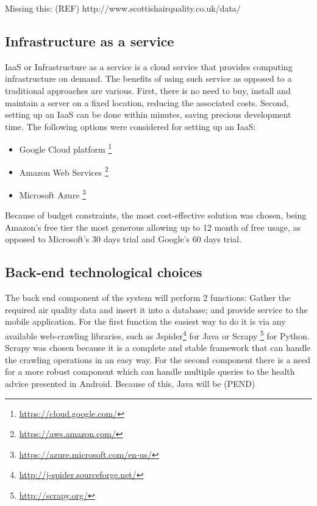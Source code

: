 Missing this: (REF)
http://www.scottishairquality.co.uk/data/

\subsection{Infrastructure as a service}
IaaS or Infrastructure as a service is a cloud service that provides computing infrastructure on demand. The benefits of using such service as opposed to a traditional approaches are various. First, there is no need to buy, install and maintain a server on a fixed location, reducing the associated costs. Second, setting up an IaaS can be done within minutes, saving precious development time. The following options were considered for setting up an IaaS: 

\begin{itemize}
	\item Google Cloud platform \footnote{\url{https://cloud.google.com/}}
    \item Amazon Web Services \footnote{\url{https://aws.amazon.com/}}
    \item Microsoft Azure \footnote{\url{https://azure.microsoft.com/en-us/}}
\end{itemize}

Because of budget constraints, the most cost-effective solution was chosen, being Amazon's free tier the most generous allowing up to 12 month of free usage, as opposed to Microsoft's 30 days trial and Google's 60 days trial.

\subsection{Back-end technological choices}
The back end component of the system will perform 2 functions: Gather the required air quality data and insert it into a database; and provide service to the mobile application. For the  first function the easiest way to do it is via any available web-crawling libraries, such as Jspider\footnote{\url{http://j-spider.sourceforge.net/}} for Java or Scrapy \footnote{\url{http://scrapy.org/}} for Python. Scrapy was chosen because it is a complete and stable framework that can handle the crawling operations in an easy way. 
For the second component there is a need for a more robust component which can handle multiple queries to the health advice presented in Android. Because of this, Java will be (PEND)

